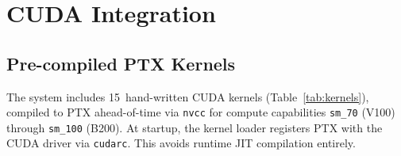 \documentclass[11pt,a4paper]{article}
\begin{document}
\section{CUDA Integration}
\label{sec:cuda}

\subsection{Pre-compiled PTX Kernels}

The system includes 15~hand-written CUDA kernels (Table~\ref{tab:kernels}),
compiled to PTX ahead-of-time via \texttt{nvcc} for compute capabilities
\texttt{sm\_70} (V100) through \texttt{sm\_100} (B200). At startup, the kernel
loader registers PTX with the CUDA driver via \texttt{cudarc}. This avoids runtime
JIT compilation entirely.
\end{document}
